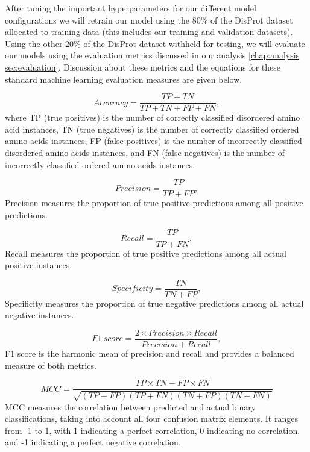 \documentclass{l4proj}
\begin{document}
After tuning the important hyperparameters for our different model configurations we will retrain our model using the 80\% of the DisProt dataset allocated to training data (this includes our training and validation datasets). Using the other 20\% of the DisProt dataset withheld for testing, we will evaluate our models using the evaluation metrics discussed in our analysis \ref{chap:analysis sec:evaluation}. Discussion about these metrics and the equations for these standard machine learning evaluation measures are given below. 

\begin{equation*}
Accuracy = \frac{TP + TN}{TP + TN + FP + FN} ,
\end{equation*}
where TP (true positives) is the number of correctly classified disordered amino acid instances, TN (true negatives) is the number of correctly classified ordered amino acids instances, FP (false positives) is the number of incorrectly classified disordered amino acids instances, and FN (false negatives) is the number of incorrectly classified ordered amino acids instances.

\begin{equation*}
Precision = \frac{TP}{TP + FP} ,
\end{equation*}
Precision measures the proportion of true positive predictions among all positive predictions.

\begin{equation*}
Recall = \frac{TP}{TP + FN} ,
\end{equation*}
Recall measures the proportion of true positive predictions among all actual positive instances.

\begin{equation*}
Specificity = \frac{TN}{TN + FP} ,
\end{equation*}
Specificity measures the proportion of true negative predictions among all actual negative instances.

\begin{equation*}
F1\ score = \frac{2 \times Precision \times Recall}{Precision + Recall} ,
\end{equation*}
F1 score is the harmonic mean of precision and recall and provides a balanced measure of both metrics.

\begin{equation*}
MCC = \frac{TP \times TN - FP \times FN}{\sqrt{(TP + FP)(TP + FN)(TN + FP)(TN + FN)}}
\end{equation*}
MCC measures the correlation between predicted and actual binary classifications, taking into account all four confusion matrix elements. It ranges from -1 to 1, with 1 indicating a perfect correlation, 0 indicating no correlation, and -1 indicating a perfect negative correlation.
\end{document}
